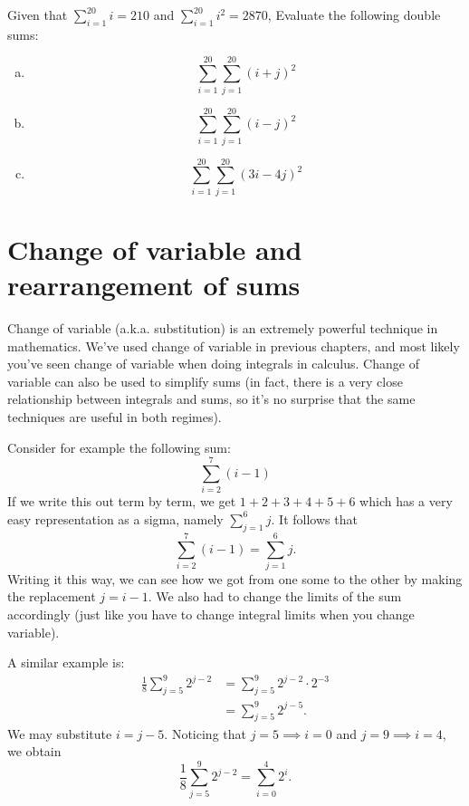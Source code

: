 \begin{exercise}{}
Given that $\sum_{i=1}^{20} i = 210$ and $\sum_{i=1}^{20} i^2 = 2870$, Evaluate the following double sums:
\begin{enumerate}[(a)]
\item
\[ \sum_{i=1}^{20} \sum_{j=1}^{20} (i+j)^2 \] 
\item
\[ \sum_{i=1}^{20} \sum_{j=1}^{20} (i-j)^2 \] 
\item
\[ \sum_{i=1}^{20} \sum_{j=1}^{20} (3i-4j)^2 \] 
\end{enumerate}
\end{exercise}


\section{Change of variable and  rearrangement of sums\quad
{}}
 \label{sec:SigmaNotation:Nested}

Change of variable (a.k.a. substitution) is an extremely powerful technique in mathematics. We've used change of variable in previous chapters, and most likely you've seen change of variable when doing integrals in calculus.  Change of variable can also be used to simplify sums (in fact, there is a very close relationship between integrals and sums, so it's no surprise that the same techniques are useful in both regimes).

Consider for example the following sum:
\[\sum_{i=2}^{7}(i-1)\] 
If we write this out term by term, we get
$1+2+3+4+5+6$ which has a very easy representation as a sigma, namely 
$\sum_{j=1}^{6}j$. It follows that
\[\sum_{i=2}^{7}(i-1) = \sum_{j=1}^{6}j. \] 
Writing it this way, we can see how we got from one some to the other by making the replacement $j = i-1$. We also had to change the limits of the sum accordingly (just like you have to change integral limits when you change variable).

A similar example is:
\begin{align*}
\frac{1}{8}\sum_{j=5}^{9} 2^{j-2} &= \sum_{j=5}^{9} 2^{j-2} \cdot 2^{-3}\\
 &=\sum_{j=5}^{9} 2^{j-5}.
\end{align*}
We may substitute $i = j-5$.  Noticing that $j=5 \implies i=0$ and $j=9 \implies i=4$, we obtain
\[
\frac{1}{8}\sum_{j=5}^{9} 2^{j-2}
=\sum_{i=0}^4 2^i.
\]

